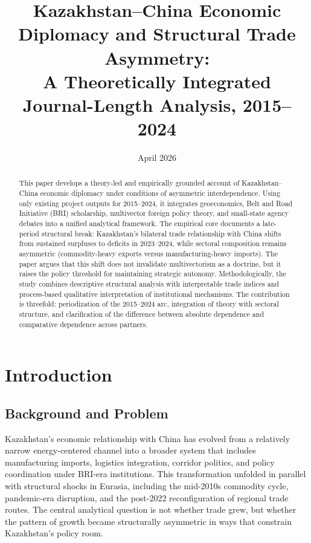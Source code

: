\documentclass[12pt]{article}
\title{Kazakhstan--China Economic Diplomacy and Structural Trade Asymmetry:\\
A Theoretically Integrated Journal-Length Analysis, 2015--2024}
\author{}
\date{April 2026}
\begin{document}
\maketitle

\begin{abstract}
This paper develops a theory-led and empirically grounded account of Kazakhstan--China economic diplomacy under conditions of asymmetric interdependence. Using only existing project outputs for 2015--2024, it integrates geoeconomics, Belt and Road Initiative (BRI) scholarship, multivector foreign policy theory, and small-state agency debates into a unified analytical framework. The empirical core documents a late-period structural break: Kazakhstan's bilateral trade relationship with China shifts from sustained surpluses to deficits in 2023--2024, while sectoral composition remains asymmetric (commodity-heavy exports versus manufacturing-heavy imports). The paper argues that this shift does not invalidate multivectorism as a doctrine, but it raises the policy threshold for maintaining strategic autonomy. Methodologically, the study combines descriptive structural analysis with interpretable trade indices and process-based qualitative interpretation of institutional mechanisms. The contribution is threefold: periodization of the 2015--2024 arc, integration of theory with sectoral structure, and clarification of the difference between absolute dependence and comparative dependence across partners.
\end{abstract}

\section{Introduction}
\subsection{Background and Problem}
Kazakhstan's economic relationship with China has evolved from a relatively narrow energy-centered channel into a broader system that includes manufacturing imports, logistics integration, corridor politics, and policy coordination under BRI-era institutions. This transformation unfolded in parallel with structural shocks in Eurasia, including the mid-2010s commodity cycle, pandemic-era disruption, and the post-2022 reconfiguration of regional trade routes. The central analytical question is not whether trade grew, but whether the pattern of growth became structurally asymmetric in ways that constrain Kazakhstan's policy room.
\end{document}
